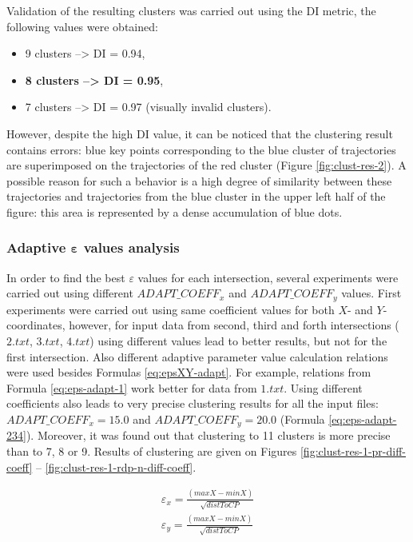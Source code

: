 Validation of the resulting clusters was carried out using the DI metric, the following values were obtained:

\begin{itemize}
	\setlength\itemsep{0em}
	\item 9 clusters --> DI = 0.94,
	\item \textbf{8 clusters --> DI = 0.95},
	\item 7 clusters --> DI = 0.97 (visually invalid clusters).
\end{itemize}

However, despite the high DI value, it can be noticed that the clustering result contains errors: blue key points corresponding to the blue cluster of trajectories are superimposed on the trajectories of the red cluster (Figure \ref{fig:clust-res-2}). A possible reason for such a behavior is a high degree of similarity between these trajectories and trajectories from the blue cluster in the upper left half of the figure: this area is represented by a dense accumulation of blue dots.

\subsubsection{Adaptive $\bm{\varepsilon}$ values analysis}

In order to find the best $\varepsilon$ values for each intersection, several experiments were carried out using different $ADAPT\_COEFF_x$ and $ADAPT\_COEFF_y$ values. First experiments were carried out using same coefficient values for both $X$- and $Y$-coordinates, however, for input data from second, third and forth intersections ($2.txt$, $3.txt$, $4.txt$) using different values lead to better results, but not for the first intersection. Also different adaptive parameter value calculation relations were used besides Formulas \ref{eq:epsXY-adapt}. For example, relations from Formula \ref{eq:eps-adapt-1} work better for data from $1.txt$. Using different coefficients also leads to very precise clustering results for all the input files: $ADAPT\_COEFF_x = 15.0$ and $ADAPT\_COEFF_y = 20.0$ (Formula \ref{eq:eps-adapt-234}). Moreover, it was found out that clustering to 11 clusters is more precise than to 7, 8 or 9. Results of clustering are given on Figures \ref{fig:clust-res-1-pr-diff-coeff} -- \ref{fig:clust-res-1-rdp-n-diff-coeff}.

\begin{subequations}\label{eq:eps-adapt-1}
	\begin{align}
		\varepsilon_x = \frac{(maxX - minX)}{\sqrt{distToCP}} \\
		\varepsilon_y = \frac{(maxX - minX)}{\sqrt{distToCP}}
	\end{align}
\end{subequations}

